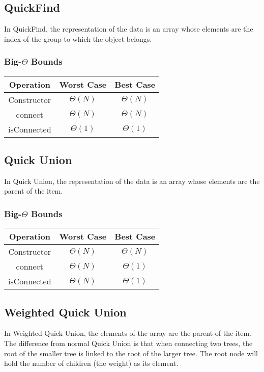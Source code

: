 \documentclass{article}
\begin{document}
\subsection{QuickFind}
In QuickFind, the representation of the data is an array whose elements are the index of the group to which the object belongs.
\subsubsection{Big-$\Theta$ Bounds}
\begin{center}
    \begin{tabular}{ c | c | c }
     Operation & Worst Case & Best Case\\
     \hline
     Constructor & $\Theta(N)$ & $\Theta(N)$\\ 
     connect & $\Theta(N)$ & $\Theta(N)$\\  
     isConnected & $\Theta(1)$ & $\Theta(1)$\\
    \end{tabular}
\end{center}
\subsection{Quick Union}
In Quick Union, the representation of the data is an array whose elements are the parent of the item.
\subsubsection{Big-$\Theta$ Bounds}
\begin{center}
    \begin{tabular}{ c | c | c }
     Operation & Worst Case & Best Case\\
     \hline
     Constructor & $\Theta(N)$ & $\Theta(N)$\\ 
     connect & $\Theta(N)$ & $\Theta(1)$\\  
     isConnected & $\Theta(N)$ & $\Theta(1)$\\
    \end{tabular}
\end{center}
\subsection{Weighted Quick Union}
In Weighted Quick Union, the elements of the array are the parent of the item.
The difference from normal Quick Union is that when connecting two trees, the root of the smaller tree is linked to the root of the larger tree.
The root node will hold the number of children (the weight) as its element.
\end{document}
